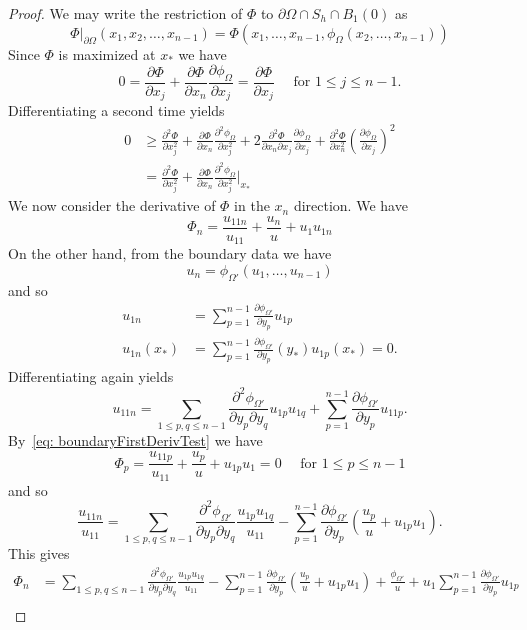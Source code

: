 \documentclass[12pt,reqno]{amsart}
\newcommand{\del}{\partial}
\numberwithin{equation}{section}
\begin{document}
\begin{proof}
 We may write the restriction of  $\Phi$ to $\del\Omega \cap S_h \cap B_1(0)$ as
 \[
 \Phi\big|_{\del \Omega}(x_1,x_2,\ldots,x_{n-1}) = \Phi(x_1,\ldots,x_{n-1},\phi_\Omega(x_2,\ldots,x_{n-1}))
 \]
 Since $\Phi$ is maximized at $x_*$ we have
\begin{equation} \label{eq: boundaryFirstDerivTest}
 0=\frac{\del \Phi}{\del x_j} + \frac{\del \Phi}{\del x_n}\frac{\del \phi_{\Omega}}{\del x_j} = \frac{\del \Phi}{\del x_j} \quad \text{ for }1\leq j\leq n-1.
 \end{equation}
 Differentiating a second time yields
 \begin{equation}\label{eq: boundarySecondDerivTest}
 \begin{aligned}
0&\geq  \frac{\del^2 \Phi}{\del x_j^2} + \frac{\del \Phi}{\del x_n}\frac{\del^2 \phi_{\Omega}}{\del x_j^2} + 2\frac{\del^2 \Phi}{\del x_n\del x_{j}}\frac{\del \phi_{\Omega}}{\del x_j} + \frac{\del ^2\Phi}{\del x_n^2}\left(\frac{\del \phi_{\Omega}}{\del x_j}\right)^2\\
&= \frac{\del^2 \Phi}{\del x_j^2} + \frac{\del \Phi}{\del x_n}\frac{\del^2 \phi_{\Omega}}{\del x_j^2}\bigg|_{x_*}
\end{aligned}
 \end{equation}
We now consider the derivative of $\Phi$ in the $x_n$ direction.  We have
 \[
 \Phi_{n} = \frac{u_{11n}}{u_{11}}+\frac{u_n}{u} + u_1u_{1n}
 \]
 On the other hand, from the boundary data we have
 \[
 u_{n} = \phi_{\Omega'}(u_1,\ldots,u_{n-1})
 \]
 and so
 \[
 \begin{aligned}
 u_{1n} &= \sum_{p=1}^{n-1}\frac{\del \phi_{\Omega'}}{\del y_p}u_{1p} \\
  u_{1n}(x_*) &= \sum_{p=1}^{n-1}\frac{\del \phi_{\Omega'}}{\del y_p}(y_*)u_{1p}(x_*) = 0.
  \end{aligned}
 \]
 Differentiating again yields
 \[
 u_{11n} = \sum_{1 \leq p,q \leq n-1}\frac{\del^2 \phi_{\Omega'}}{\del y_p\del y_q}u_{1p}u_{1q} + \sum_{p=1}^{n-1}\frac{\del \phi_{\Omega'}}{\del y_p}u_{11p}.
 \]
By~\eqref{eq: boundaryFirstDerivTest} we have
\[
\Phi_p = \frac{u_{11p}}{u_{11}} + \frac{u_p}{u} + u_{1p}u_1=0 \quad \text{ for } 1 \leq p \leq n-1
\]
and so
\[
\frac{u_{11n}}{u_{11}} = \sum_{1 \leq p,q \leq n-1}\frac{\del^2 \phi_{\Omega'}}{\del y_p\del y_q}\frac{u_{1p}u_{1q}}{u_{11}} - \sum_{p=1}^{n-1}\frac{\del \phi_{\Omega'}}{\del y_p}\left(\frac{u_p}{u} + u_{1p}u_1\right).
\]
This gives
\[
\begin{aligned}
\Phi_n &= \sum_{1 \leq p,q \leq n-1}\frac{\del^2 \phi_{\Omega'}}{\del y_p\del y_q}\frac{u_{1p}u_{1q}}{u_{11}} - \sum_{p=1}^{n-1}\frac{\del \phi_{\Omega'}}{\del y_p}\left(\frac{u_p}{u} + u_{1p}u_1\right) + \frac{\phi_{\Omega'}}{u} + u_1 \sum_{p=1}^{n-1}\frac{\del \phi_{\Omega'}}{\del y_p}u_{1p}\\

\end{aligned}\]
\end{proof}
\end{document}
